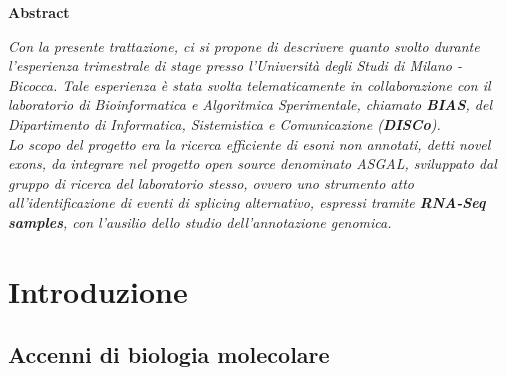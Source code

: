 \documentclass[a4paper,12pt, oneside]{book}
\begin{document}
\newpage
\thispagestyle{plain}
\begin{flushleft}
  \huge{\textbf{Abstract}}
\end{flushleft}
\vspace{10mm}
\textit{Con la presente trattazione, ci si propone di descrivere quanto svolto
  durante l'esperienza trimestrale di stage presso l’\textit{Università degli
    Studi di Milano - Bicocca}. Tale esperienza è stata svolta telematicamente
  in collaborazione con il laboratorio di \emph{Bioinformatica e Algoritmica
    Sperimentale}, chiamato
  \emph{\textbf{BIAS}}, del \emph{Dipartimento di Informatica, Sistemistica e
    Comunicazione (\textbf{DISCo})}.\\
  Lo scopo del progetto era la ricerca efficiente di esoni non annotati, detti
  \emph{novel exons}, da integrare nel progetto open source denominato
  \emph{ASGAL}, sviluppato dal gruppo di ricerca del laboratorio stesso, ovvero
  uno strumento 
  atto all'identificazione di eventi di \textit{splicing alternativo}, espressi
  tramite \textbf{RNA-Seq samples}, con l'ausilio dello studio dell'annotazione
  genomica.}
{\pagestyle{plain}
  \tableofcontents
  \cleardoublepage}
\chapter{Introduzione}
\section{Accenni di biologia molecolare}
\end{document}
